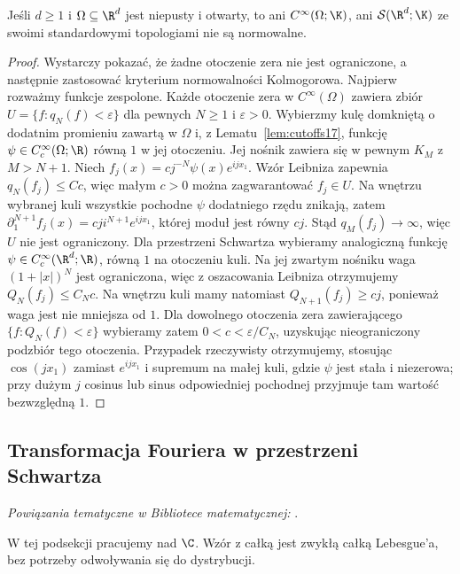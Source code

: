 \begin{stwierdzenie}
\label{prop:non-normable17}
Jeśli $d\ge1$ i $\Omega\subseteq\R^d$ jest niepusty i otwarty,
to ani $C^\infty(\Omega;\K)$, ani $\mathcal S(\R^d;\K)$
ze swoimi standardowymi topologiami nie są normowalne.
\end{stwierdzenie}
\begin{proof}
Wystarczy pokazać, że żadne otoczenie zera nie jest ograniczone,
a następnie zastosować kryterium normowalności Kolmogorowa.
Najpierw rozważmy funkcje zespolone. Każde otoczenie zera
w $C^\infty(\Omega)$ zawiera zbiór $U=\{f:q_N(f)<\varepsilon\}$
dla pewnych $N\ge1$ i $\varepsilon>0$.
Wybierzmy kulę domkniętą o dodatnim promieniu zawartą w $\Omega$
i, z Lematu~\ref{lem:cutoffs17}, funkcję
$\psi\in C_c^\infty(\Omega;\R)$ równą $1$ w jej otoczeniu.
Jej nośnik zawiera się w pewnym $K_M$ z $M>N+1$.
Niech $f_j(x)=c j^{-N}\psi(x)e^{ijx_1}$.
Wzór Leibniza zapewnia $q_N(f_j)\le Cc$,
więc małym $c>0$ można zagwarantować $f_j\in U$.
Na wnętrzu wybranej kuli wszystkie pochodne $\psi$
dodatniego rzędu znikają, zatem
$\partial_1^{N+1}f_j(x)=c j i^{N+1}e^{ijx_1}$,
której moduł jest równy $cj$. Stąd
$q_M(f_j)\to\infty$, więc $U$ nie jest ograniczony.
Dla przestrzeni Schwartza wybieramy analogiczną funkcję
$\psi\in C_c^\infty(\R^d;\R)$, równą $1$ na otoczeniu kuli.
Na jej zwartym nośniku waga $(1+|x|)^N$ jest ograniczona,
więc z oszacowania Leibniza otrzymujemy $Q_N(f_j)\le C_Nc$.
Na wnętrzu kuli mamy natomiast
$Q_{N+1}(f_j)\ge cj$, ponieważ waga jest nie mniejsza od $1$.
Dla dowolnego otoczenia zera zawierającego
$\{f:Q_N(f)<\varepsilon\}$ wybieramy zatem
$0<c<\varepsilon/C_N$, uzyskując nieograniczony podzbiór
tego otoczenia.
Przypadek rzeczywisty otrzymujemy, stosując
$\cos(jx_1)$ zamiast $e^{ijx_1}$ i supremum na małej kuli,
gdzie $\psi$ jest stała i niezerowa; przy dużym $j$
cosinus lub sinus odpowiedniej pochodnej przyjmuje tam
wartość bezwzględną $1$.
\end{proof}

\subsection{Transformacja Fouriera w przestrzeni Schwartza}

\noindent\emph{Powiązania tematyczne w Bibliotece matematycznej:} .


W tej podsekcji pracujemy nad $\C$. Wzór z całką jest zwykłą
całką Lebesgue'a, bez potrzeby odwoływania się do dystrybucji.

